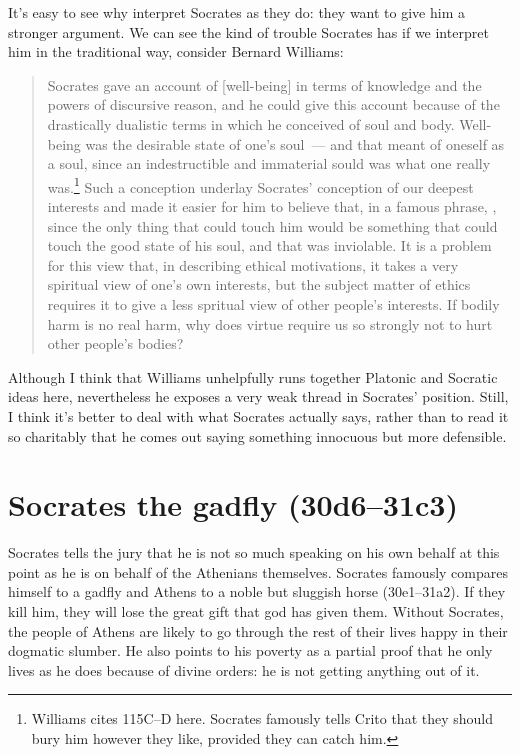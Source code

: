 \documentclass[11pt]{article}
\begin{document}
It's easy to see why \citeauthor{brickhouse2004} interpret Socrates as they do: they want to give him a stronger argument.  We can see the kind of trouble Socrates has if we interpret him in the traditional way, consider Bernard Williams:

\begin{quote}
    Socrates gave an account of [well-being] in terms of knowledge and the powers of discursive reason, and he could give this account because of the drastically dualistic terms in which he conceived of soul and body. Well-being was the desirable state of one's soul~--- and that meant of oneself as a soul, since an indestructible and immaterial sould was what one really was.\footnote{Williams cites  115C--D here.  Socrates famously tells Crito that they should bury him however they like, provided they can catch him.}  Such a conception underlay Socrates' conception of our deepest interests and made it easier for him to believe that, in a famous phrase, , since the only thing that could touch him would be something that could touch the good state of his soul, and that was inviolable.  It is a problem for this view that, in describing ethical motivations, it takes a very spiritual view of one's own interests, but the subject matter of ethics requires it to give a less spritual view of other people's interests. If bodily harm is no real harm, why does virtue require us so strongly not to hurt other people's bodies? \citep[34]{williams1985}
\end{quote}

Although I think that Williams unhelpfully runs together Platonic and Socratic ideas here, nevertheless he exposes a very weak thread in Socrates' position.  Still, I think it's better to deal with what Socrates actually says, rather than to read it so charitably that he comes out saying something innocuous but more defensible.

\section{Socrates the gadfly (30d6--31c3)}

Socrates tells the jury that he is not so much speaking on his own behalf at this point as he is on behalf of the Athenians themselves.  Socrates famously compares himself to a gadfly and Athens to a noble but sluggish horse (30e1--31a2).  If they kill him, they will lose the great gift that god has given them.  Without Socrates, the people of Athens are likely to go through the rest of their lives happy in their dogmatic slumber.  He also points to his poverty as a partial proof that he only lives as he does because of divine orders: he is not getting anything out of it.
\end{document}
